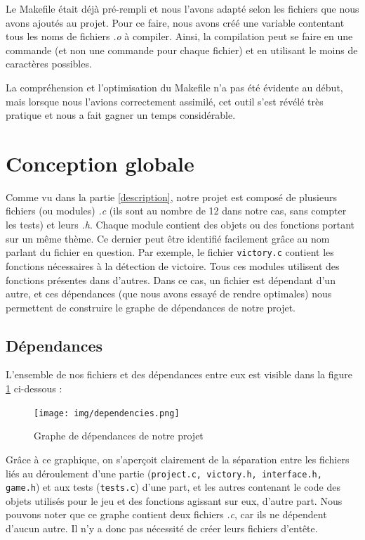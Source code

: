 \documentclass[a4paper]{article}
\begin{document}
Le Makefile était déjà pré-rempli et nous l'avons adapté selon les fichiers que nous avons ajoutés au projet. Pour ce faire, nous avons créé une variable contentant tous les noms de fichiers \emph{.o} à compiler. Ainsi, la compilation peut se faire en une commande (et non une commande pour chaque fichier) et en utilisant le moins de caractères possibles.

La compréhension et l'optimisation du Makefile n'a pas été évidente au début, mais lorsque nous l'avions correctement assimilé, cet outil s'est révélé très pratique et nous a fait gagner un temps considérable.


\section{Conception globale}
\label{conception}

Comme vu dans la partie \ref{description}, notre projet est composé de plusieurs fichiers (ou modules) \emph{.c} (ils sont au nombre de 12 dans notre cas, sans compter les tests) et leurs \emph{.h}. Chaque module contient des objets ou des fonctions portant sur un même thème. Ce dernier peut être identifié facilement grâce au nom parlant du fichier en question. Par exemple, le fichier \verb|victory.c| contient les fonctions nécessaires à la détection de victoire. Tous ces modules utilisent des fonctions présentes dans d'autres. Dans ce cas, un fichier est dépendant d'un autre, et ces dépendances (que nous avons essayé de rendre optimales) nous permettent de construire le graphe de dépendances de notre projet.

\subsection{Dépendances}
\label{dep}

L'ensemble de nos fichiers et des dépendances entre eux est visible dans la figure \ref{fig:dep} ci-dessous :

\begin{center}
\begin{figure}[H]
    \centering
    \texttt{[image: img/dependencies.png]}~\\[0.5 cm]
    \caption{Graphe de dépendances de notre projet}
    \label{fig:dep}
\end{figure}
\end{center}

Grâce à ce graphique, on s'aperçoit clairement de la séparation entre les fichiers liés au déroulement d'une partie (\verb|project.c, victory.h, interface.h, game.h|) et aux tests (\verb|tests.c|) d'une part, et les autres contenant le code des objets utilisés pour le jeu et des fonctions agissant sur eux, d'autre part. Nous pouvons noter que ce graphe contient deux fichiers \emph{.c}, car ils ne dépendent d'aucun autre. Il n'y a donc pas nécessité de créer leurs fichiers d'entête.
\end{document}
